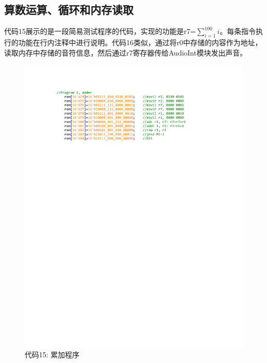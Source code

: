 \documentclass[titlepage, 11pt]{article}
\begin{document}
		\subsection{算数运算、循环和内存读取}
			代码15展示的是一段简易测试程序的代码，实现的功能是r7=$\sum_{i=1}^{100}i$。每条指令执行的功能在行内注释中进行说明。代码16类似，通过将r0中存储的内容作为地址，读取内存中存储的音符信息，然后通过r7寄存器传给AudioInt模块发出声音。
			\begin{figure}[H]
				\centering
				\includegraphics[scale=1]{37.pdf}
				\caption*{代码15: 累加程序}
			\end{figure}
\end{document}

